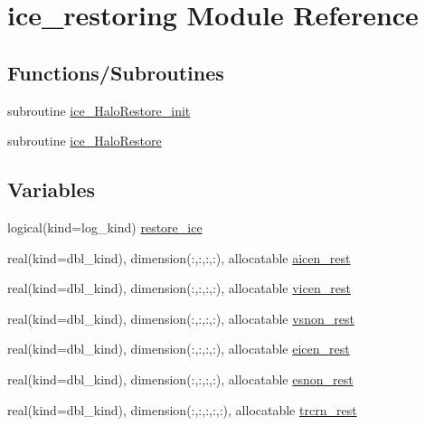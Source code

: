 \hypertarget{namespaceice__restoring}{
\section{ice\_\-restoring Module Reference}
\label{namespaceice__restoring}
}
\subsection*{Functions/Subroutines}
\begin{DoxyCompactItemize}
\item 
subroutine \hyperlink{namespaceice__restoring_a5abeabb1c3d2382c18bedd81914b9b60}{ice\_\-HaloRestore\_\-init}
\item 
subroutine \hyperlink{namespaceice__restoring_a49df88e98add45cf36562220985fea56}{ice\_\-HaloRestore}
\end{DoxyCompactItemize}
\subsection*{Variables}
\begin{DoxyCompactItemize}
\item 
logical(kind=log\_\-kind) \hyperlink{namespaceice__restoring_a4c1ab4e7a35fa0a753fd36909805bfc9}{restore\_\-ice}
\item 
real(kind=dbl\_\-kind), dimension(:,:,:,:), allocatable \hyperlink{namespaceice__restoring_a1e0ef4f98814f59a3331155876b9a23f}{aicen\_\-rest}
\item 
real(kind=dbl\_\-kind), dimension(:,:,:,:), allocatable \hyperlink{namespaceice__restoring_a4ebbb2fde1fd6d9cd8b5e5b9d3d87282}{vicen\_\-rest}
\item 
real(kind=dbl\_\-kind), dimension(:,:,:,:), allocatable \hyperlink{namespaceice__restoring_a631c5dd66d9dbbad28240813763f7acf}{vsnon\_\-rest}
\item 
real(kind=dbl\_\-kind), dimension(:,:,:,:), allocatable \hyperlink{namespaceice__restoring_a355c3e0f0ff976375ef772137ca2fb89}{eicen\_\-rest}
\item 
real(kind=dbl\_\-kind), dimension(:,:,:,:), allocatable \hyperlink{namespaceice__restoring_a58f323dca24452c0602f2010b2bdec76}{esnon\_\-rest}
\item 
real(kind=dbl\_\-kind), dimension(:,:,:,:,:), allocatable \hyperlink{namespaceice__restoring_a4d5ba93af3c3dfb0760f609dc7ed6692}{trcrn\_\-rest}
\end{DoxyCompactItemize}


